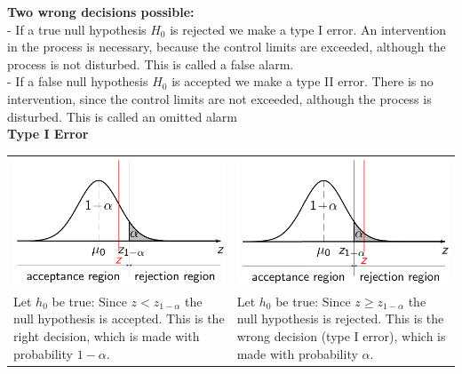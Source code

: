 \textbf{Two wrong decisions possible:}\\
 - If a true null hypothesis $H_0$ is rejected we make a type I error. An intervention in the process is necessary, because the control limits are exceeded, although the process is not disturbed. This is called a false alarm.\\
 - If a false null hypothesis $H_0$ is accepted we make a type II error. There is no intervention, since the control limits are not exceeded, although the process is disturbed. This is called an omitted alarm\\

\textbf{Type I Error}\\
\begin{table}[H]
  \setlength{\tabcolsep}{0.2em}
  \footnotesize
  \begin{tabular}{p{}@{\hskip 1em}p{}}
    \includegraphics[width=\linewidth]{Pics/3.2.1.png}& \includegraphics[width=\linewidth]{Pics/3.2.2.png} \\
    Let $h_0$ be true: Since $z < z_{1-\alpha}$ the null hypothesis is accepted. This is the right decision, which is made with probability $1-\alpha$. &
    Let $h_0$ be true: Since $z \geq z_{1-\alpha}$ the null hypothesis is rejected. This is the wrong decision (type I error), which is made with probability $\alpha$.
  \end{tabular}
\end{table}

